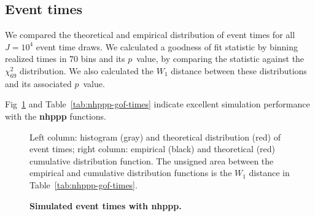 \documentclass[10pt,letterpaper]{article}
\newcommand{\pkg}[1]{{\bf #1}}
\begin{document}
\subsection{Event times}\label{sec:example-event-times}

We compared the theoretical and empirical distribution of event times for all $J=\ensuremath{10^{4}}$ event time draws. We calculated a goodness of fit statistic by binning realized times in $70$ bins and its $p$~value, by comparing the statistic against the $\chi^2_{69}$ distribution. We also calculated the $W_1$ distance between these distributions and its associated $p$~value.

Fig~\ref{fig:epdf-nhppp-pkg-times} and Table~\ref{tab:nhppp-gof-times} indicate excellent simulation performance with the \pkg{nhppp} functions.



\begin{Schunk}
\begin{figure}[ht!]
\caption{{\bf Simulated event times with \pkg{nhppp}.}}\label{fig:epdf-nhppp-pkg-times}
{\centering 
%\texttt{[image: figure/epdf-nhppp-pkg-times-1]} 
}
\begin{flushleft}
Left column: histogram (gray) and theoretical distribution (red) of event times; right column: empirical (black) and theoretical (red) cumulative distribution function. The unsigned area between the empirical and cumulative distribution functions is the $W_1$ distance in Table~\ref{tab:nhppp-gof-times}.
\end{flushleft}
\end{figure}
\end{Schunk}



\begin{table}[ht!]
\centering
\caption{\textbf{Goodness of fit of simulated event times with \pkg{nhppp} functions for the example.}} 
\label{tab:nhppp-gof-times}
\end{table}
\end{document}

